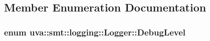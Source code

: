 \subsection{Member Enumeration Documentation}
\hypertarget{classuva_1_1smt_1_1logging_1_1_logger_ad8a08f17c873112b1717d5fadbfe32d1}{}
\subsubsection[{Debug\+Level}]{\setlength{\rightskip}{0pt plus 5cm}enum {\bf uva\+::smt\+::logging\+::\+Logger\+::\+Debug\+Level}}\label{classuva_1_1smt_1_1logging_1_1_logger_ad8a08f17c873112b1717d5fadbfe32d1}
